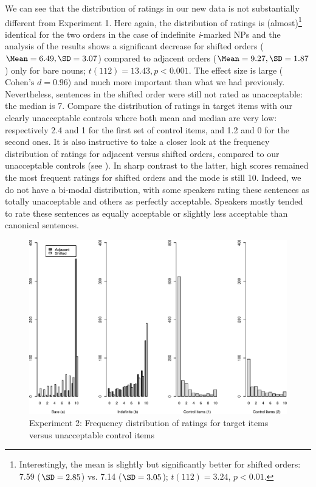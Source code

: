 \documentclass[output=paper]{langsci/langscibook}
\begin{document}
We can see that the distribution of ratings in our new data is not substantially different from Experiment 1.
Here again, the distribution of ratings is (almost)\footnote{Interestingly, the mean is slightly but significantly better for shifted orders: 7.59 ($\SD=2.85$) vs. 7.14 ($\SD=3.05$); $t(112)=3.24$, $p<0.01$.} identical for the two orders in the case of indefinite \textit{i}-marked NPs and the analysis of the results shows a significant decrease for shifted orders ($\Mean=6.49, \SD=3.07$) compared to adjacent orders ($\Mean=9.27, \SD=1.87$) only for bare nouns; $t(112)=13.43, p<0.001$. The effect size is large ($\text{Cohen's } d=0.96$) and much more important than what we had previously. Nevertheless, sentences in the shifted order were still not rated as unacceptable: the median  is 7. Compare the distribution of ratings in target items with our clearly unacceptable controls where both mean and median are very low: respectively 2.4 and 1 for the first set of control items, and 1.2 and 0 for the second ones.
It is also instructive to take a closer look at the frequency distribution of ratings for adjacent versus shifted orders, compared to our unacceptable controls (see ).  In sharp contrast to the latter, high scores remained the most frequent ratings for shifted orders and the mode is still 10.
Indeed, we do not have a bi-modal distribution, with some speakers rating these sentences as totally unacceptable and others as perfectly acceptable. Speakers mostly tended to rate these sentences as equally acceptable or slightly less acceptable than canonical sentences.

\begin{figure}[h]
          \includegraphics[width=\textwidth]{plots/Rplot06.pdf}
	\caption{Experiment 2: Frequency distribution of ratings for target items versus unacceptable control items}\label{barplot1}
\end{figure}
\end{document}
